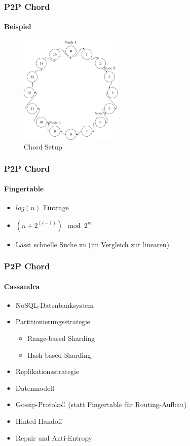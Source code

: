 \begin{frame}
  \frametitle{P2P Chord}
  \framesubtitle{Beispiel}
  \begin{figure}[!ht]
    \centering
    \includegraphics[width=0.45\textwidth]{fig/tex-grapics/chord.pdf.png}
    \caption{Chord Setup}
    \label{fig:chord}
  \end{figure}
\end{frame}

\begin{frame}
  \frametitle{P2P Chord}
  \framesubtitle{Fingertable}
  \begin{itemize}
    \item $log(n)$ Einträge
    \item $(n + 2^{(i-1)}) \mod 2^m$
    \item Lässt schnelle Suche zu (im Vergleich zur linearen)
  \end{itemize}
\end{frame}

\begin{frame}
  \frametitle{P2P Chord}
  \framesubtitle{Cassandra}
  \begin{itemize}
    \item NoSQL-Datenbanksystem
    \item Partitionierungsstrategie
    \begin{itemize}
      \item Range-based Sharding
      \item Hash-based Sharding
    \end{itemize}
    \item Replikationsstrategie
    \item Datenmodell
    \item Gossip-Protokoll (statt Fingertable für Routing-Aufbau)
    \item Hinted Handoff
    \item Repair und Anti-Entropy
  \end{itemize}
\end{frame}